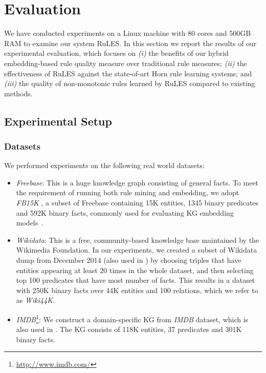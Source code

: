 
\chapter{Evaluation}
\label{sec:eva}
We have conducted experiments on a Linux machine with 80 cores and 500GB RAM to examine our system RuLES. In this section we report the results of our experimental evaluation, which focuses on 
\emph{(i)} the benefits of our hybrid embedding-based rule quality measure over traditional rule measures; 
\emph{(ii)} the effectiveness of RuLES against the state-of-art Horn rule learning systems; and 
\emph{(iii)} the quality of non-monotonic rules learned by RuLES compared to existing methods.

\section{Experimental Setup}
\label{sec:exper_setup}

\subsection{Datasets}
We performed experiments on the following real world datasets: 

\begin{itemize}
\item \textit{Freebase}: This is a huge knowledge graph consisting of general facts. To meet the requirement of running both rule mining and embedding, we adopt \textit{FB15K} \cite{Bordes:NIPS2013}, a subset of Freebase containing 15K entities, 1345 binary predicates and 592K binary facts, commonly used for evaluating KG embedding models~\cite{DBLP:journals/tkde/WangMWG17}.
\item \textit{Wikidata}: This is a free, community-based knowledge base maintained by the Wikimedia Foundation. In our experiments, we created a subset of Wikidata dump from December 2014 (also used in \cite{amie}) by choosing triples that have entities appearing at least 20 times in the whole dataset, and then selecting top 100 predicates that have most number of facts. This results in a dataset with 250K binary facts over 44K entities and 100 relations, which we refer to as \textit{Wiki44K}.
\item \textit{IMDB}\footnote{\url{http://www.imdb.com/}}: We construct a domain-specific KG from \textit{IMDB} dataset, which is also used in \cite{trantowards}. The KG consists of 118K entities, 37 predicates and 301K binary facts.
\end{itemize}

